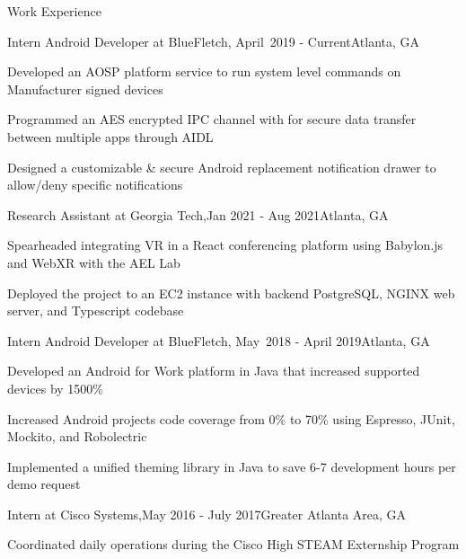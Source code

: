 \documentclass{resume} %
\begin{document}
\begin{rSection}{Work Experience}
	
		\begin{rSubsection}{Intern Android Developer at BlueFletch,}{ April~2019 - Current}{}{}{Atlanta, GA}
		\item Developed an AOSP platform service to run system level commands on Manufacturer signed devices
		\item Programmed an AES encrypted IPC channel with for secure data transfer between multiple apps through AIDL
		\item Designed a customizable \& secure Android replacement notification drawer to allow/deny specific notifications
		
	\end{rSubsection} 
	
	\begin{rSubsection}{Research Assistant  at Georgia Tech,}{Jan 2021 - Aug 2021}{}{}{Atlanta, GA}
		\item Spearheaded integrating VR in a React conferencing platform using Babylon.js and WebXR with the AEL Lab 
		\item Deployed the project to an EC2 instance with backend PostgreSQL, NGINX web server, and Typescript codebase
	\end{rSubsection} 

	\begin{rSubsection}{Intern Android Developer at BlueFletch,}{ May~2018 - April 2019}{}{}{Atlanta, GA}
	\item Developed an Android for Work platform in Java that increased supported devices by 1500\%
	\item Increased Android projects code coverage from 0\% to 70\% using Espresso, JUnit, Mockito, and Robolectric
	\item Implemented a unified theming library in Java to save 6-7 development hours per demo request
	
\end{rSubsection} 
	

\begin{rSubsection}{Intern at Cisco Systems,}{May 2016 - July 2017}{}{}{Greater Atlanta Area, GA}
	\item Coordinated daily operations during the Cisco High STEAM Externship Program
\end{rSubsection} 
\end{rSection} 
\end{document}
